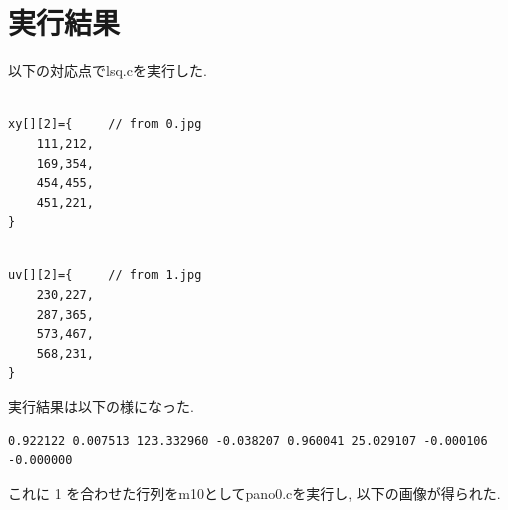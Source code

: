 \documentclass[a4j]{jarticle}
\begin{document}
\section{実行結果}
以下の対応点でlsq.cを実行した.

\begin{minipage}{0.5\hsize}
\begin{verbatim}

xy[][2]={     // from 0.jpg
    111,212,
    169,354,
    454,455,
    451,221,
}

\end{verbatim}
\end{minipage}
\begin{minipage}{0.5\hsize}
\begin{verbatim}

uv[][2]={     // from 1.jpg
    230,227,
    287,365,
    573,467,
    568,231,
}

\end{verbatim}
\end{minipage}
実行結果は以下の様になった.
\begin{verbatim}
0.922122 0.007513 123.332960 -0.038207 0.960041 25.029107 -0.000106 -0.000000
\end{verbatim}
これに 1 を合わせた行列をm10としてpano0.cを実行し, 以下の画像が得られた.
\end{document}
